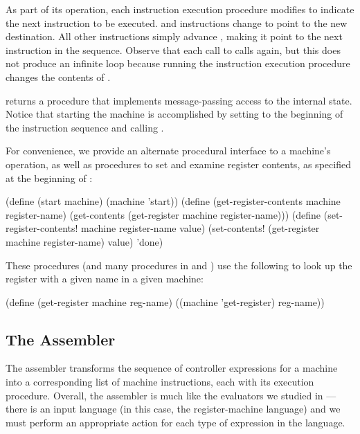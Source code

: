 \noindent
As part of its operation, each instruction execution procedure modifies
 to indicate the next instruction to be executed.   and
 instructions change  to point to the new destination.  All
other instructions simply advance , making it point to the next
instruction in the sequence.  Observe that each call to  calls
 again, but this does not produce an infinite loop because
running the instruction execution procedure changes the contents of .

 returns a  procedure that implements
message-passing access to the internal state.  Notice that starting the machine
is accomplished by setting  to the beginning of the instruction
sequence and calling .

For convenience, we provide an alternate procedural interface to a machine's
 operation, as well as procedures to set and examine register
contents, as specified at the beginning of :

\begin{codeBlock}
(define (start machine) (machine 'start))
(define (get-register-contents machine
                               register-name)
  (get-contents (get-register machine
                              register-name)))
(define (set-register-contents! machine
                                register-name
                                value)
  (set-contents! (get-register
                   machine
                   register-name)
                 value)
  'done)
\end{codeBlock}

\noindent
These procedures (and many procedures in  and )
use the following to look up the register with a given name in a given machine:

\begin{codeBlock}
(define (get-register machine reg-name)
  ((machine 'get-register) reg-name))
\end{codeBlock}

\subsection{The Assembler}
\label{Section 5.2.2}

The assembler transforms the sequence of controller expressions for a machine
into a corresponding list of machine instructions, each with its execution
procedure.  Overall, the assembler is much like the evaluators we studied in
---there is an input language (in this case, the
register-machine language) and we must perform an appropriate action for each
type of expression in the language.

